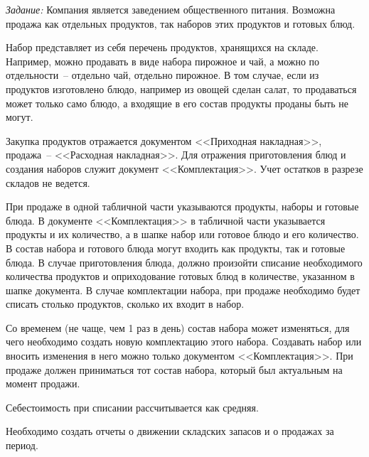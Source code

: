 \documentclass[12pt,pscyr]{hedlab}
\begin{document}
  \makeheader
  \emph{Задание:}
  Компания является заведением общественного питания. Возможна продажа как
  отдельных продуктов, так наборов этих продуктов и готовых блюд.
  
  Набор представляет из себя перечень продуктов, хранящихся на складе.
  Например, можно продавать в виде набора пирожное и чай, а можно по
  отдельности~-- отдельно чай, отдельно пирожное. В том случае, если из
  продуктов изготовлено блюдо, например из овощей сделан салат, то продаваться
  может только само блюдо, а входящие в его состав продукты проданы быть не
  могут.
  
  Закупка продуктов отражается документом <<Приходная накладная>>,
  продажа~-- <<Расходная накладная>>. Для отражения приготовления блюд и
  создания наборов служит документ <<Комплектация>>. Учет остатков в разрезе
  складов не ведется.
  
  При продаже в одной табличной части указываются продукты, наборы и готовые
  блюда. В документе <<Комплектация>> в табличной части указывается продукты и
  их количество, а в шапке набор или готовое блюдо и его количество. В состав
  набора и готового блюда могут входить как продукты, так и готовые блюда. В
  случае приготовления блюда, должно произойти списание необходимого количества
  продуктов и оприходование готовых блюд в количестве, указанном в шапке
  документа. В случае комплектации набора, при продаже необходимо будет списать
  столько продуктов, сколько их входит в набор.
  
  Со временем (не чаще, чем 1 раз в день) состав набора может изменяться, для
  чего необходимо создать новую комплектацию этого набора. Создавать набор или
  вносить изменения в него можно только документом <<Комплектация>>. При продаже
  должен приниматься тот состав набора, который был актуальным на момент
  продажи.
  
  Себестоимость при списании рассчитывается как средняя.
  
  Необходимо создать отчеты о движении складских запасов и о продажах за
  период.\\
  
\end{document}
